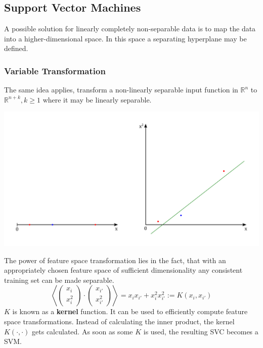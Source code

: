 \documentclass[11pt]{article}
\theoremstyle{definition}
\newcommand*\R{\mathbb{R}}
\begin{document}
\subsection{Support Vector Machines}
A possible solution for linearly completely non-separable data is to map the data into a higher-dimensional space. In this space a separating hyperplane may be defined. 

\subsubsection{Variable Transformation}
The same idea applies, transform a non-linearly separable input function in $\R^n$ to $\R^{n+k}, k\geq 1$ where it may be linearly separable.

\begin{center}
	\includegraphics[keepaspectratio,width=0.6\linewidth]{variable_transformation.png}
\end{center}

The power of feature space transformation lies in the fact, that with an appropriately chosen feature space of sufficient dimensionality any consistent training set can be made separable.
\begin{equation*}
	\left\langle \begin{pmatrix}x_i\\x_i^2\end{pmatrix} \cdot\begin{pmatrix}x_{i'}\\x_{i'}^2\end{pmatrix} \right\rangle = x_i x_{i' } + x_i^2 x_{i' }^2 := K(x_i,x_{i'})
\end{equation*}
$K$ is known as a \textbf{kernel} function. It can be used to efficiently compute feature space transformations. Instead of calculating the inner product, the kernel $K(\cdot,\cdot)$ gets calculated. As soon as some $K$ is used, the resulting SVC becomes a SVM.
\end{document}
